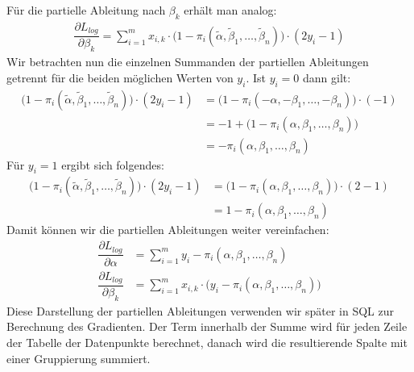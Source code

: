 Für die partielle Ableitung nach $\beta_k$ erhält man analog:
\begin{align*}
    \dfrac{\partial L_{log}}{\partial \beta_k} = \sum_{i=1}^m x_{i, k} \cdot \big(1 - \pi_i(\tilde\alpha, \tilde\beta_1, \dots, \tilde\beta_n) \big) \cdot (2 y_i - 1)
\end{align*}
Wir betrachten nun die einzelnen Summanden der partiellen Ableitungen getrennt für die beiden möglichen Werten von $y_i$. Ist $y_i = 0$ dann gilt:
\begin{align*}
    \big(1 - \pi_i(\tilde\alpha, \tilde\beta_1, \dots, \tilde\beta_n) \big) \cdot (2 y_i - 1) &= \big(1 - \pi_i(- \alpha, - \beta_1, \dots, - \beta_n) \big) \cdot (- 1) \\
    &= - 1 + \big(1 - \pi_i(\alpha, \beta_1, \dots, \beta_n) \big) \\
    &= - \pi_i(\alpha, \beta_1, \dots, \beta_n)
\end{align*}
Für $y_i = 1$ ergibt sich folgendes:
\begin{align*}
    \big(1 - \pi_i(\tilde\alpha, \tilde\beta_1, \dots, \tilde\beta_n) \big) \cdot (2 y_i - 1) &= \big(1 - \pi_i(\alpha, \beta_1, \dots, \beta_n) \big) \cdot (2 - 1) \\
    &= 1 - \pi_i(\alpha, \beta_1, \dots, \beta_n)
\end{align*}
Damit können wir die partiellen Ableitungen weiter vereinfachen:
\begin{align*}
    \dfrac{\partial L_{log}}{\partial \alpha} &= \sum_{i=1}^m y_i - \pi_i(\alpha, \beta_1, \dots, \beta_n) \\
    \dfrac{\partial L_{log}}{\partial \beta_k} &= \sum_{i=1}^m x_{i, k} \cdot \big(y_i - \pi_i(\alpha, \beta_1, \dots, \beta_n) \big)
\end{align*}
Diese Darstellung der partiellen Ableitungen verwenden wir später in SQL zur Berechnung des Gradienten. Der Term innerhalb der Summe wird für jeden Zeile der Tabelle der Datenpunkte berechnet, danach wird die resultierende Spalte mit einer Gruppierung summiert.
